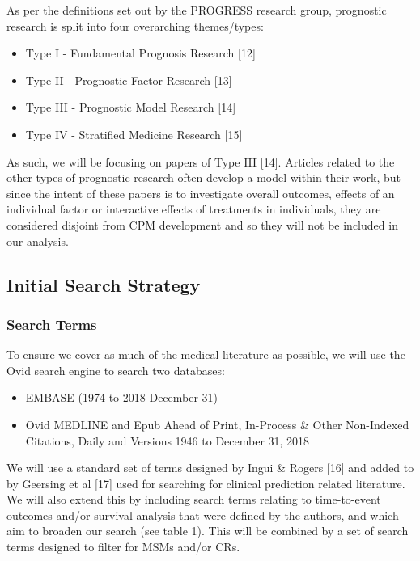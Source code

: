 \documentclass[12pt,PhD,twoside,openright]{muthesis}
\providecommand{\tightlist}{%
  \setlength{\itemsep}{0pt}\setlength{\parskip}{0pt}}
\begin{document}
As per the definitions set out by the PROGRESS research group, prognostic research is split into four overarching themes/types:
\begin{itemize}
\tightlist
\item
  Type I - Fundamental Prognosis Research {[}12{]}
\item
  Type II - Prognostic Factor Research {[}13{]}
\item
  Type III - Prognostic Model Research {[}14{]}
\item
  Type IV - Stratified Medicine Research {[}15{]}
\end{itemize}
As such, we will be focusing on papers of Type III {[}14{]}. Articles related to the other types of prognostic research often develop a model within their work, but since the intent of these papers is to investigate overall outcomes, effects of an individual factor or interactive effects of treatments in individuals, they are considered disjoint from CPM development and so they will not be included in our analysis.

\hypertarget{initial-search-strategy}{%
\subsection{Initial Search Strategy}\label{initial-search-strategy}}

\hypertarget{search-terms}{%
\subsubsection{Search Terms}\label{search-terms}}

To ensure we cover as much of the medical literature as possible, we will use the Ovid search engine to search two databases:
\begin{itemize}
\tightlist
\item
  EMBASE (1974 to 2018 December 31)
\item
  Ovid MEDLINE and Epub Ahead of Print, In-Process \& Other Non-Indexed Citations, Daily and Versions 1946 to December 31, 2018
\end{itemize}
We will use a standard set of terms designed by Ingui \& Rogers {[}16{]} and added to by Geersing et al {[}17{]} used for searching for clinical prediction related literature. We will also extend this by including search terms relating to time-to-event outcomes and/or survival analysis that were defined by the authors, and which aim to broaden our search (see table 1). This will be combined by a set of search terms designed to filter for MSMs and/or CRs.
\end{document}

